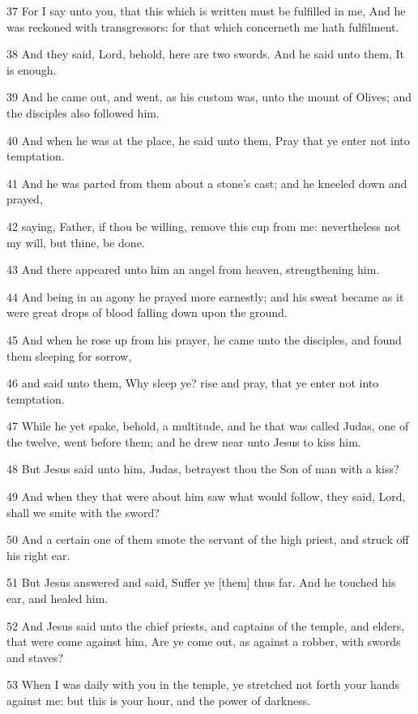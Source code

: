 \par 37 For I say unto you, that this which is written must be fulfilled in me, And he was reckoned with transgressors: for that which concerneth me hath fulfilment.
\par 38 And they said, Lord, behold, here are two swords. And he said unto them, It is enough.
\par 39 And he came out, and went, as his custom was, unto the mount of Olives; and the disciples also followed him.
\par 40 And when he was at the place, he said unto them, Pray that ye enter not into temptation.
\par 41 And he was parted from them about a stone's cast; and he kneeled down and prayed,
\par 42 saying, Father, if thou be willing, remove this cup from me: nevertheless not my will, but thine, be done.
\par 43 And there appeared unto him an angel from heaven, strengthening him.
\par 44 And being in an agony he prayed more earnestly; and his sweat became as it were great drops of blood falling down upon the ground.
\par 45 And when he rose up from his prayer, he came unto the disciples, and found them sleeping for sorrow,
\par 46 and said unto them, Why sleep ye? rise and pray, that ye enter not into temptation.
\par 47 While he yet spake, behold, a multitude, and he that was called Judas, one of the twelve, went before them; and he drew near unto Jesus to kiss him.
\par 48 But Jesus said unto him, Judas, betrayest thou the Son of man with a kiss?
\par 49 And when they that were about him saw what would follow, they said, Lord, shall we smite with the sword?
\par 50 And a certain one of them smote the servant of the high priest, and struck off his right ear.
\par 51 But Jesus answered and said, Suffer ye [them] thus far. And he touched his ear, and healed him.
\par 52 And Jesus said unto the chief priests, and captains of the temple, and elders, that were come against him, Are ye come out, as against a robber, with swords and staves?
\par 53 When I was daily with you in the temple, ye stretched not forth your hands against me: but this is your hour, and the power of darkness.
